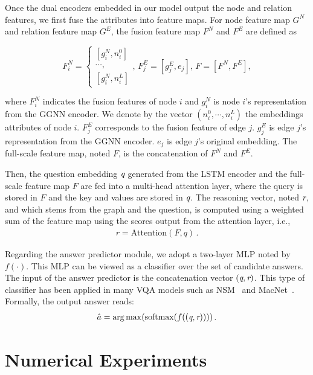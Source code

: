\documentclass[letterpaper]{article} %
\begin{document}
Once the dual encoders embedded in our model output the node and relation features, we first fuse the attributes into feature maps. For node feature map $G^N$ and relation feature map $G^E$, the fusion feature map $F^N$ and $F^E$ are defined as

{\small \begin{equation}
F_i^N= \begin{cases}
[g_i^N, n_i^0]  \\
\cdots, \\
[g_i^N, n_i^L]
\end{cases} 
,\, F_j^E = [g_j^E, e_j] , \,
    F = [F^N, F^E]  ,
\end{equation}
}

where $F_i^N$ indicates the fusion features of node $i$ and $g_i^N$ is node $i$'s representation from the GGNN encoder. 
We denote by the vector $(n_i^0, \cdots,n_i^L)$ the embeddings attributes of node $i$. 
$F_j^E$ corresponds to the fusion feature of edge $j$. $g_j^E$ is edge $j$'s representation from the GGNN encoder. 
$e_j$ is edge $j$'s original embedding. 
The full-scale feature map, noted $F$, is the concatenation of $F^N$ and $F^E$.

Then, the question embedding $\emph{q}$ generated from the LSTM encoder and the full-scale feature map $F$ are fed into a multi-head attention layer, where the query is stored in $F$ and the key and values are stored in $\emph{q}$.
The reasoning vector, noted $\emph{r}$, and which stems from the graph and the question, is computed using a weighted sum of the feature map using the scores output from the attention layer, i.e.,
\begin{gather}
    r = \text{Attention}(F, q) \, .
\end{gather}

Regarding the answer predictor module, we adopt a two-layer MLP noted by $f(\cdot)$. 
This MLP can be viewed as a classifier over the set of candidate answers. 
The input of the answer predictor is the concatenation vector $(\emph{q},\emph{r})$. 
This type of classifier has been applied in many VQA models such as NSM~\cite{DBLP:conf/nips/HudsonM19} and MacNet~\cite{DBLP:conf/nips/LuYBP16}.
Formally, the output answer reads:
\begin{gather}
    \hat{a} = \mathop{\arg\max}(\text{softmax}(f((\emph{q},\emph{r}))))\, .
\end{gather}



\section{Numerical Experiments}\label{sec:experiments}
\end{document}
